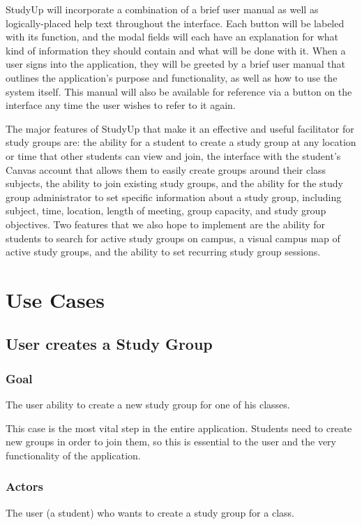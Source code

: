 \documentclass[12pt,letterpaper]{article}
\begin{document}
StudyUp will incorporate a combination of a brief user manual as well as logically-placed help text throughout the interface. Each button will be labeled with its function, and the modal fields will each have an explanation for what kind of information they should contain and what will be done with it. When a user signs into the application, they will be greeted by a brief user manual that outlines the application's purpose and functionality, as well as how to use the system itself. This manual will also be available for reference via a button on the interface any time the user wishes to refer to it again. 

The major features of StudyUp that make it an effective and useful facilitator for study groups are: the ability for a student to create a study group at any location or time that other students can view and join, the interface with the student's Canvas account that allows them to easily create groups around their class subjects, the ability to join existing study groups, and the ability for the study group administrator to set specific information about a study group, including subject, time, location, length of meeting, group capacity, and study group objectives. Two features that we also hope to implement are the ability for students to search for active study groups on campus, a visual campus map of active study groups, and the ability to set recurring study group sessions. 

\section{Use Cases}

\subsection{User creates a Study Group}
\subsubsection{Goal}
The user ability to create a new study group for one of his classes.

This case is the most vital step in the entire application. Students need to create new groups in order to join them, so this is essential to the user and the very functionality of the application.

\subsubsection{Actors}
The user (a student) who wants to create a study group for a class.
\end{document}
